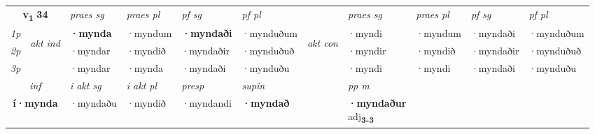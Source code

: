 \noindent
\begin{tabular}{lllllllllll} \toprule
\multicolumn{2}{c}{\textbf{v{\textsubscript{1}}} \Large{\textbf{34}}}  &  \textit{praes sg}  & \textit{praes pl}  &\textit{ pf sg} & \textit{pf pl} &  &  \textit{praes sg}  & \textit{praes pl}  & \textit{pf sg} & \textit{pf pl } \\*
	\cmidrule{3-6} \cmidrule{8-11}
 {\textit{1p}} & \multirow{3}{*}{\begin{turn}{90}\textit{akt ind}\end{turn}} & \textbf{·mynda} & ·myndum & \textbf{·myndaði} & ·mynduðum & \multirow{3}{*}{\begin{turn}{90}\textit{akt con}\end{turn}} &·myndi & ·myndum & ·myndaði & ·mynduðum\\*
 {\textit{2p}} &  &  ·myndar  & ·myndið & ·myndaðir & ·mynduðuð & & ·myndir & ·myndið & ·myndaðir & ·mynduðuð \\*
{\textit{3p}} &  & ·myndar & ·mynda & ·myndaði & ·mynduðu & & ·myndi & ·myndi& ·myndaði & ·mynduðu \\*
\cmidrule{3-6} \cmidrule{8-11}

   \multicolumn{2}{c}{\textit{inf}}  & \textit{i akt sg} & \textit{i akt pl}   & \textit{presp} & \textit{supin}  && \textit{pp m} \\*
  \multicolumn{2}{c}{\textbf{í\allowbreak ·mynda}} & ·myndaðu  & ·myndið   & ·myndandi &  \textbf{·myndað}  && \specialcell{\textbf{·myndaður} \\ adj\textbf{\textsubscript{3-3}}} \\*
\end{tabular}

